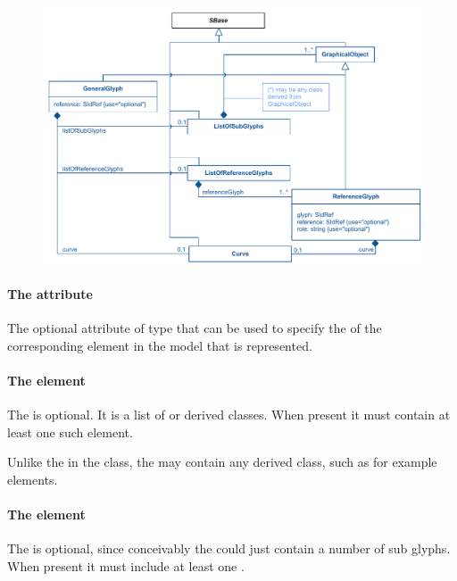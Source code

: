 \begin{figure}[!h]
\includegraphics[scale=0.9]{uml/layout-generalglyph-model-uml}\\
\label{uml:generalglyph}
\end{figure}

\paragraph{The  attribute}
The optional  attribute of type  that 
can be used to specify the  of the corresponding element in 
the model that is represented. 


\paragraph {The  element}
\label{listofsubglyphs-class}
The \ListOfSubGlyphs is optional. It is a list of \GraphicalObject or 
derived classes. When present it must contain at least one such element. 

Unlike the \ListOfAdditionalGraphicalObjects in the \LayoutClass class, 
the  may contain any derived class, such as for 
example \TextGlyph elements. 


\paragraph {The  element}
\label{listofreferenceglyphs-class}
The \ListOfReferenceGlyphs is optional, since conceivably the \GeneralGlyph could just contain a number of sub glyphs. When present it must include at least one \ReferenceGlyph. 


